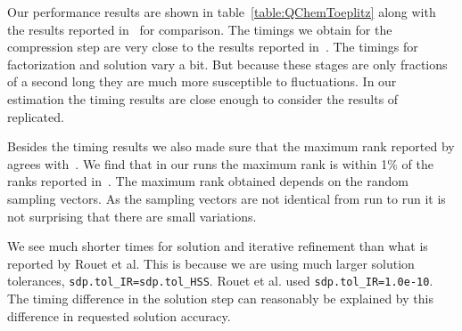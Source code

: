 \documentclass{acmsmall}
\begin{document}
Our performance results are shown in
table~\ref{table:QChemToeplitz} along with the results reported
in~\cite{rouet:strumpack} for comparison.  The timings we obtain
for the compression step are very close to the results reported
in~\cite{rouet:strumpack}.  The timings for factorization and
solution vary a bit.  But because these stages are only fractions
of a second long they are much more susceptible to fluctuations.
In our estimation the timing results are close enough to consider
the results of~\cite{rouet:strumpack} replicated.
\begin{table}
\label{table:QChemToeplitz}
\end{table}

Besides the timing results we also made sure that the maximum
rank reported by \strumpack{} agrees with~\cite{rouet:strumpack}.
We find that in our runs the maximum rank is within 1\% of the
ranks reported in~\cite{rouet:strumpack}.  The maximum rank
obtained depends on the random sampling vectors.  As the sampling
vectors are not identical from run to run it is not surprising
that there are small variations.

We see much shorter times for solution and iterative refinement
than what is reported by Rouet et al.  This is because we are
using much larger solution tolerances,
\verb~sdp.tol_IR=sdp.tol_HSS~.  Rouet et al. used
\verb~sdp.tol_IR=1.0e-10~.  The timing difference in the solution
step can reasonably be explained by this difference in requested
solution accuracy.
\end{document}
